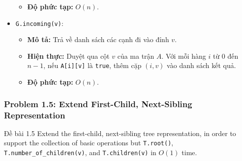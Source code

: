 \documentclass[a4paper,12pt]{article}
\begin{document}
\begin{itemize}
\begin{itemize}
            \item \textbf{Độ phức tạp:} $O(n)$.
        \end{itemize}
    \item \texttt{G.incoming(v)}:
        \begin{itemize}
            \item \textbf{Mô tả:} Trả về danh sách các cạnh đi vào đỉnh $v$.
            \item \textbf{Hiện thực:} Duyệt qua cột $v$ của ma trận $A$. Với mỗi hàng $i$ từ $0$ đến $n-1$, nếu \texttt{A[i][v]} là \texttt{true}, thêm cặp $(i, v)$ vào danh sách kết quả.
            \item \textbf{Độ phức tạp:} $O(n)$.
        \end{itemize}
\end{itemize}

\subsubsection{Problem 1.5: Extend First-Child, Next-Sibling Representation}
\begin{problembox}{Đề bài 1.5}
    Extend the first-child, next-sibling tree representation, in order to support the collection of basic operations but \texttt{T.root()}, \texttt{T.number\_of\_children(v)}, and \texttt{T.children(v)} in $O(1)$ time.
\end{problembox}
\end{document}
